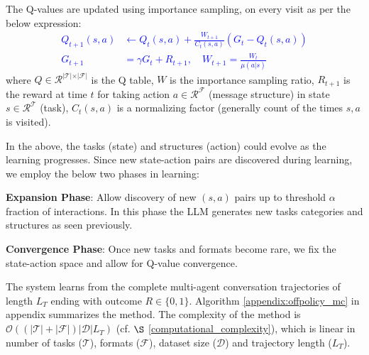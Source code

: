 The Q-values are updated using importance sampling, on every visit as per the below expression:
\vspace{-0.5cm}\textcolor{blue}{
\begin{align*}\label{q_update}
Q_{t+1}(s,a) &\leftarrow Q_t(s,a) + \frac{W_{t+1}}{C_t(s,a)}(G_t - Q_t(s,a)) \\
G_{t+1} &= \gamma G_t + R_{t+1}, \quad W_{t+1} = \frac{W_t}{\mu(a|s)}
\end{align*}
}
where $Q \in \mathcal{R^{\lvert T \lvert \times \lvert F \lvert}}$ is the Q table, $W$ is the importance sampling ratio, $R_{t+1}$ is the reward at time $t$ for taking action $a \in \mathcal{R^F}$ (message structure) in state $s \in \mathcal{R^T}$ (task), $C_t(s,a)$ is a normalizing factor (generally count of the times $s,a$ is visited).

In the above, the tasks (state) and structures (action) could evolve as the learning progresses.
Since new state-action pairs are discovered during learning, we employ the below two phases in learning:

\textbf{Expansion Phase}: Allow discovery of new $(s,a)$ pairs up to threshold $\alpha$ fraction of interactions. In this phase the LLM generates new tasks categories and structures as seen previously.

\textbf{Convergence Phase}: 
Once new tasks and formats become rare, we fix the state-action space and allow for Q-value convergence. 



The system learns from the complete multi-agent conversation trajectories of length $L_T$ ending with outcome $R \in \{0,1\}$. Algorithm \ref{appendix:offpolicy_mc} in appendix summarizes the method. The complexity of the method is $\mathcal{O}(\mathcal{(\lvert T \rvert + \lvert F \rvert) \lvert D \rvert}L_T)$ (cf. $\S$ \ref{computational_complexity}), which is linear in number of tasks ($\mathcal{T}$), formats ($\mathcal{F}$), dataset size ($\mathcal{D}$) and trajectory length ($L_T$).

